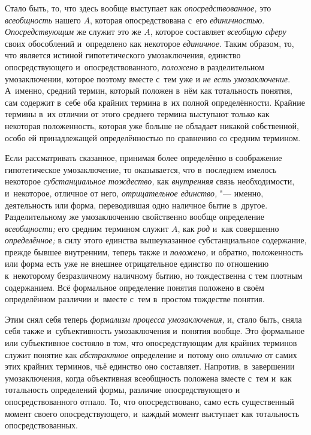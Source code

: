 Стало быть, то, что здесь вообще выступает как {\em опосредствованное,}
это {\em всеобщность} нашего $A$, которая опосредствована с~его
{\em единичностью}. {\em Опосредствующим} же служит это же $A$,
которое составляет {\em всеобщую сферу}
своих обособлений и~определено как некоторое {\em единичное}. Таким
образом, то, что является истиной гипотетического умозаключения, единство
опосредствующего и~опосредствованного, {\em положено} в
разделительном умозаключении, которое поэтому вместе с~тем уже и
{\em не есть умозаключение}.
А~именно, средний термин, который положен в~нём как
тотальность понятия, сам содержит в~себе оба крайних термина в~их полной
определённости. Крайние термины в~их отличии от этого среднего термина
выступают только как некоторая положенность, которая уже больше не обладает
никакой собственной, особо ей принадлежащей определённостью по сравнению со
средним термином.

Если рассматривать сказанное, принимая более определённо в
соображение гипотетическое умозаключение, то оказывается, что в~последнем
имелось некоторое {\em субстанциальное тождество,} как {\em внутренняя} связь
необходимости, и~некоторое, отличное от него,
{\em отрицательное единство,} "---
именно, деятельность или форма, переводившая одно наличное
бытие в~другое. Разделительному же умозаключению свойственно вообще
определение {\em всеобщности;} его средним термином служит $A$,
как {\em род} и~как совершенно {\em определённое;} в
силу этого единства вышеуказанное субстанциальное содержание, прежде бывшее
внутренним, теперь также и {\em положено,} и
обратно, положенность или форма есть уже не внешнее отрицательное единство
по отношению к~некоторому безразличному наличному бытию, но тождественна с
тем плотным содержанием. Всё формальное определение понятия положено в
своём определённом различии и~вместе с~тем в~простом тождестве понятия.

Этим снял себя теперь {\em формализм процесса умозаключения,}
и, стало быть, сняла себя также и~субъективность
умозаключения и~понятия вообще. Это формальное или субъективное состояло в
том, что опосредствующим для крайних терминов служит понятие как
{\em абстрактное} определение и~потому оно {\em отлично} от самих
этих крайних терминов, чьё единство оно составляет. Напротив, в~завершении
умозаключения, когда объективная всеобщность положена вместе с~тем и~как
тотальность определений формы, различие опосредствующего и
опосредствованного отпало. То, что опосредствовано, само есть существенный
момент своего опосредствующего, и~каждый момент выступает как тотальность
опосредствованных.


